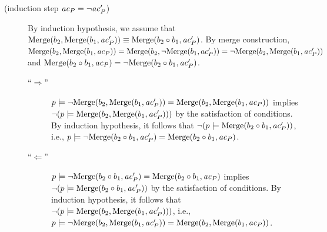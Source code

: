 \begin{description}
\item[(induction step $\mathit{ac}_P = \neg \mathit{ac}'_P$)]
By induction hypothesis, we assume that $\mathrm{Merge}(b_2,\mathrm{Merge}(b_1,\mathit{ac}'_P)) \equiv \mathrm{Merge}(b_2 \circ b_1, \mathit{ac}'_P)$.
By merge construction, $\mathrm{Merge}(b_2,\mathrm{Merge}(b_1,\mathit{ac}_P))=\mathrm{Merge}(b_2,\neg \mathrm{Merge}(b_1,ac'_P))=\neg \mathrm{Merge}(b_2,\mathrm{Merge}(b_1,\mathit{ac}'_P))$ and $\mathrm{Merge}(b_2 \circ b_1,\mathit{ac}_P)=\neg \mathrm{Merge}(b_2 \circ b_1,\mathit{ac}'_P)$.
\begin{description}
\item[``$\Rightarrow$'']
$p \models \neg \mathrm{Merge}(b_2,\mathrm{Merge}(b_1,\mathit{ac}'_P))=\mathrm{Merge}(b_2,\mathrm{Merge}(b_1,\mathit{ac}_P))$ implies $\neg(p \models \mathrm{Merge}(b_2,\mathrm{Merge}(b_1,\mathit{ac}'_P)))$ by the satisfaction of conditions.
By induction hypothesis, it follows that $\neg(p \models \mathrm{Merge}(b_2 \circ b_1,\mathit{ac}'_P))$, i.e., $p \models \neg \mathrm{Merge}(b_2 \circ b_1,\mathit{ac}'_P)=\mathrm{Merge}(b_2 \circ b_1, \mathit{ac}_P)$.
\item[``$\Leftarrow$'']
$p \models \neg \mathrm{Merge}(b_2 \circ b_1,\mathit{ac}'_P)=\mathrm{Merge}(b_2 \circ b_1,\mathit{ac}_P)$ implies $\neg(p \models \mathrm{Merge}(b_2 \circ b_1,\mathit{ac}'_P))$ by the satisfaction of conditions.
By induction hypothesis, it follows that $\neg(p \models \mathrm{Merge}(b_2,\mathrm{Merge}(b_1,\mathit{ac}'_P)))$, i.e., $p \models \neg \mathrm{Merge}(b_2,\mathrm{Merge}(b_1,\mathit{ac}'_P))=\mathrm{Merge}(b_2,\mathrm{Merge}(b_1, \mathit{ac}_P))$.
\end{description}
\end{description}

